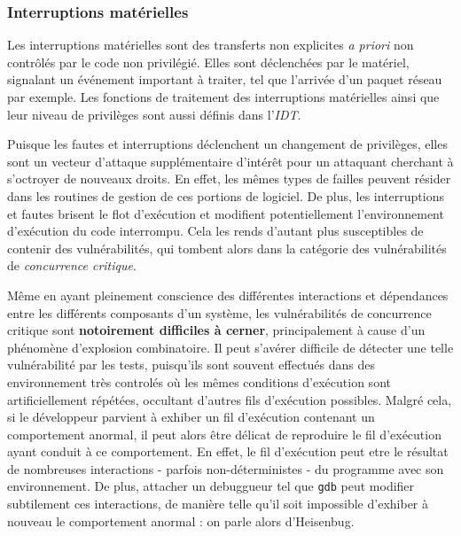 \subsubsection{Interruptions matérielles}
Les interruptions matérielles sont des transferts non explicites \textit{a priori} non contrôlés par le code non privilégié. Elles sont déclenchées par le matériel, signalant un événement important à traiter, tel que l'arrivée d'un paquet réseau par exemple. Les fonctions de traitement des interruptions matérielles ainsi que leur niveau de privilèges sont aussi définis dans l'\emph{IDT}.

Puisque les fautes et interruptions déclenchent un changement de privilèges, elles sont un vecteur d'attaque supplémentaire d'intérêt pour un attaquant cherchant à s'octroyer de nouveaux droits. En effet, les mêmes types de failles peuvent résider dans les routines de gestion de ces portions de logiciel. De plus, les interruptions et fautes brisent le flot d'exécution et modifient potentiellement l'environnement d'exécution du code interrompu. Cela les rends d'autant plus susceptibles de contenir des vulnérabilités, qui tombent alors dans la catégorie des vulnérabilités de \emph{concurrence critique}.

Même en ayant pleinement conscience des différentes interactions et dépendances entre les différents composants d'un système, les vulnérabilités de concurrence critique sont \textbf{notoirement difficiles à cerner}, principalement à cause d'un phénomène d'explosion combinatoire. Il peut s'avérer difficile de détecter une telle vulnérabilité par les tests, puisqu'ils sont souvent effectués dans des environnement très controlés où les mêmes conditions d'exécution sont artificiellement répétées, occultant d'autres fils d'exécution possibles. Malgré cela, si le développeur parvient à exhiber un fil d'exécution contenant un comportement anormal, il peut alors être délicat de reproduire le fil d'exécution ayant conduit à ce comportement. En effet, le fil d'exécution peut etre le résultat de nombreuses interactions - parfois non-déterministes - du programme avec son environnement. De plus, attacher un debuggueur tel que \texttt{gdb} peut modifier subtilement ces interactions, de manière telle qu'il soit impossible d'exhiber à nouveau le comportement anormal : on parle alors d'Heisenbug.

